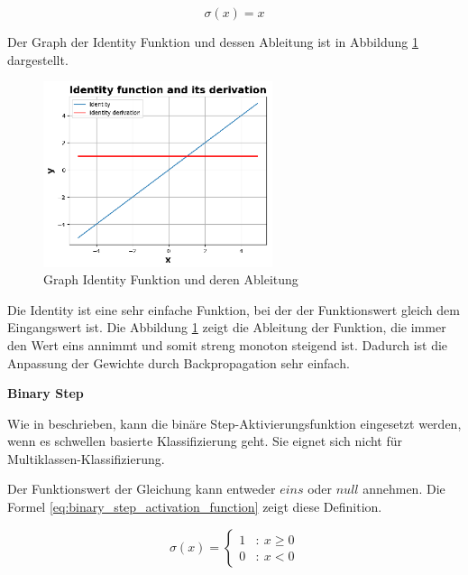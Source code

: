 \begin{equation}\label{eq:identity_activation_function}
	\sigma (x) = x
\end{equation}

Der Graph der Identity Funktion und dessen Ableitung ist in Abbildung \ref{img:identity_func_graph} dargestellt. 

\begin{figure}[!ht]
	\includegraphics[width=0.6\textwidth]{content/chapter_basics/plots/identity_func_plot.eps}
	\centering
	\caption{Graph Identity Funktion und deren Ableitung}
	\label{img:identity_func_graph}
\end{figure}

Die Identity ist eine sehr einfache Funktion, bei der der Funktionswert gleich dem Eingangswert ist. Die Abbildung \ref{img:identity_func_graph} zeigt die Ableitung der Funktion, die immer den Wert eins annimmt und somit streng monoton steigend ist. Dadurch ist die Anpassung der Gewichte durch Backpropagation sehr einfach.\vspace{0.2cm}

%
\textbf{Binary Step}\vspace{0.2cm}

Wie in \cite[311-312]{sharma-2020} beschrieben, kann die binäre Step-Aktivierungsfunktion eingesetzt werden, wenn es schwellen basierte Klassifizierung geht. Sie eignet sich nicht für Multiklassen-Klassifizierung.

Der Funktionswert der Gleichung kann entweder $eins$ oder $null$ annehmen. Die Formel \ref{eq:binary_step_activation_function} zeigt diese Definition.

\begin{equation}\label{eq:binary_step_activation_function}
	\sigma (x) = \left\{
	\begin{array}{cl}
		1 & : \ x \geq 0 \\
		0 & : \ x < 0
	\end{array}
	\right.
\end{equation}

